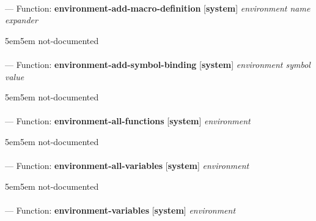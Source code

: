 \paragraph{}
\label{SYSTEM:ENVIRONMENT-ADD-MACRO-DEFINITION}
--- Function: \textbf{environment-add-macro-definition} [\textbf{system}] \textit{environment name expander}

\begin{adjustwidth}{5em}{5em}
not-documented
\end{adjustwidth}

\paragraph{}
\label{SYSTEM:ENVIRONMENT-ADD-SYMBOL-BINDING}
--- Function: \textbf{environment-add-symbol-binding} [\textbf{system}] \textit{environment symbol value}

\begin{adjustwidth}{5em}{5em}
not-documented
\end{adjustwidth}

\paragraph{}
\label{SYSTEM:ENVIRONMENT-ALL-FUNCTIONS}
--- Function: \textbf{environment-all-functions} [\textbf{system}] \textit{environment}

\begin{adjustwidth}{5em}{5em}
not-documented
\end{adjustwidth}

\paragraph{}
\label{SYSTEM:ENVIRONMENT-ALL-VARIABLES}
--- Function: \textbf{environment-all-variables} [\textbf{system}] \textit{environment}

\begin{adjustwidth}{5em}{5em}
not-documented
\end{adjustwidth}

\paragraph{}
\label{SYSTEM:ENVIRONMENT-VARIABLES}
--- Function: \textbf{environment-variables} [\textbf{system}] \textit{environment}

